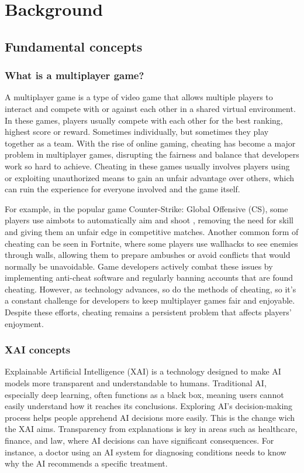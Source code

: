 \section{Background}
\label{ch:background}

\subsection{Fundamental concepts}

\subsubsection{What is a multiplayer game?}

A multiplayer game is a type of video game that allows multiple players to interact and compete with or against each other in a shared virtual environment. In these games, players usually compete with each other for the best ranking, highest score or reward. Sometimes individually, but sometimes they play together as a team. With the rise of online gaming, cheating has become a major problem in multiplayer games, disrupting the fairness and balance that developers work so hard to achieve. Cheating in these games usually involves players using or exploiting unauthorized means to gain an unfair advantage over others, which can ruin the experience for everyone involved and the game itself.

For example, in the popular game Counter-Strike: Global Offensive (CS), some players use aimbots to automatically aim and shoot \cite{291120}, removing the need for skill and giving them an unfair edge in competitive matches. Another common form of cheating can be seen in Fortnite, where some players use wallhacks \cite{10.1145/3372297.3417890} to see enemies through walls, allowing them to prepare ambushes or avoid conflicts that would normally be unavoidable. Game developers actively combat these issues by implementing anti-cheat software and regularly banning accounts that are found cheating. However, as technology advances, so do the methods of cheating, so it's a constant challenge for developers to keep multiplayer games fair and enjoyable. Despite these efforts, cheating remains a persistent problem that affects players' enjoyment.

\subsubsection{XAI concepts}

Explainable Artificial Intelligence (XAI) is a technology designed to make AI models more transparent and understandable to humans. Traditional AI, especially deep learning, often functions as a black box, meaning users cannot easily understand how it reaches its conclusions. Exploring AI's decision-making process helps people apprehend AI decisions more easily. This is the change wich the XAI aims. Transparency from explanations is key in areas such as healthcare, finance, and law, where AI decisions can have significant consequences. For instance, a doctor using an AI system for diagnosing conditions needs to know why the AI recommends a specific treatment.


